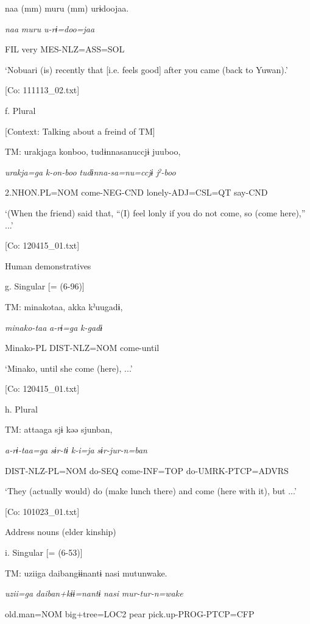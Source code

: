       naa  (mm)  muru  (mm)  urɨdoojaa.

      \textit{naa}    \textit{muru}    \textit{u-rɨ=doo=jaa}

      FIL    very    MES-NLZ=ASS=SOL

      ‘Nobuari (is) recently that [i.e. feels good] after you came (back to Yuwan).’

      [Co: 111113\_02.txt]

  f.  Plural

    [Context: Talking about a freind of TM]

    TM:  urakjaga  konboo,  tudɨnnasanuccjɨ  juuboo,

      \textit{urakja=ga}  \textit{k-on-boo}  \textit{tudɨnna-sa=nu=ccjɨ}  \textit{jˀ-boo}

      2.NHON.PL=NOM  come-NEG-CND  lonely-ADJ=CSL=QT  say-CND

      ‘(When the friend) said that, “(I) feel lonly if you do not come, so (come here),” ...’

      [Co: 120415\_01.txt]

  Human demonstratives

  g.  Singular [= (6-96)]

    TM:  minakotaa,  akka  kˀuugadɨ,

      \textit{minako-taa}  \textit{a-rɨ=ga}  \textit{k-gadɨ}

      Minako-PL  DIST-NLZ=NOM  come-until

      ‘Minako, until she come (here), ...’

      [Co: 120415\_01.txt]

  h.  Plural

    TM:  attaaga  sjɨ  kəə  sjunban,

      \textit{a-rɨ-taa=ga}  \textit{sɨr-tɨ}  \textit{k-i=ja}  \textit{sɨr-jur-n=ban}

      DIST-NLZ-PL=NOM  do-SEQ  come-INF=TOP  do-UMRK-PTCP=ADVRS

      ‘They (actually would) do (make lunch there) and come (here with it), but ...’

      [Co: 101023\_01.txt]

  Address nouns (elder kinship)

  i.  Singular [= (6-53)]

    TM:  uziiga  daibangɨɨnantɨ  nasi  mutunwake.

      \textit{uzii=ga}  \textit{daiban+kɨɨ=nantɨ}  \textit{nasi}  \textit{mur-tur-n=wake}

      old.man=NOM  big+tree=LOC2  pear  pick.up-PROG-PTCP=CFP

